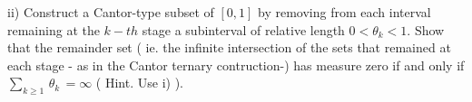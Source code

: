 ii) \qquad Construct a Cantor-type subset of $[0,1]$ by removing from each interval remaining at the $k-th$ stage a subinterval of relative length $0 < \theta_k <1$. Show that the remainder set ( ie. the infinite intersection of the sets that remained at each stage - as in the Cantor ternary contruction-) has measure zero if and only if $\sum_{k \ge 1} \, \theta_k \,  = \infty $ ( Hint. Use i) ).   

\endproclaim



\enddocument























